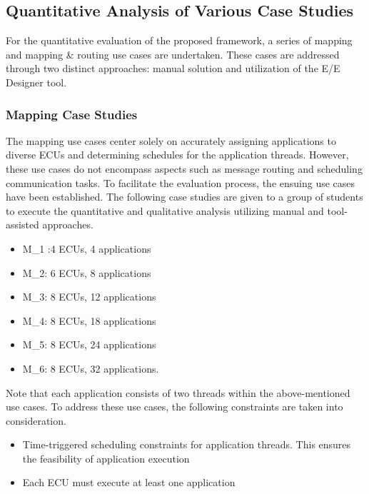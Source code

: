     \subsection{Quantitative Analysis of Various Case Studies}
        
    For the quantitative evaluation of the proposed framework, a series of mapping and mapping \& routing use cases are undertaken. These cases are addressed through two distinct approaches: manual solution and utilization of the E/E Designer tool.




    
    
    \subsubsection{Mapping Case Studies}
    
    
    The mapping use cases center solely on accurately assigning applications to diverse ECUs and determining schedules for the application threads. However, these use cases do not encompass aspects such as message routing and scheduling communication tasks. To facilitate the evaluation process, the ensuing use cases have been established. The following case studies are given to a group of students to execute the quantitative and qualitative analysis utilizing manual and tool-assisted approaches.
    
    \begin{itemize}
    \item M\_1 :4 ECUs, 4 applications 
    \item M\_2: 6 ECUs, 8 applications 
    \item M\_3: 8 ECUs, 12 applications
    \item M\_4: 8 ECUs, 18 applications 
    \item M\_5: 8 ECUs, 24 applications
    \item M\_6: 8 ECUs, 32 applications. 
    \end{itemize}
    Note that each application consists of two threads within the above-mentioned use cases.
    To address these use cases, the following constraints are taken into consideration.    \begin{itemize}
        \item Time-triggered scheduling constraints for application threads. This ensures the feasibility of application execution
        \item Each ECU must execute at least one application
    \end{itemize}
    
